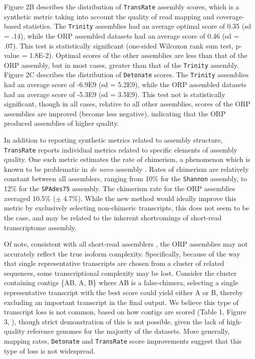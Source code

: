 \documentclass[10pt,letterpaper]{article}
\newcommand{\tit}{\textit}
\begin{document}
Figure 2B describes the distribution of \texttt{TransRate} assembly scores, which is a synthetic metric taking into account the quality of read mapping and coverage-based statistics. The \texttt{Trinity} assemblies had an average optimal score of 0.35 (sd = .14), while the ORP assembled datasets had an average score of 0.46 (sd = .07). This test is statistically significant (one-sided Wilcoxon rank sum test, p-value = 1.8E-2). Optimal scores of the other assemblies are less than that of the ORP assembly, but in most cases, greater than that of the \texttt{Trinity} assembly. Figure 2C describes the distribution of \texttt{Detonate} scores. The \texttt{Trinity} assemblies had an average score of -6.9E9 (sd = 5.2E9), while the ORP assembled datasets had an average score of -5.3E9 (sd = 3.5E9). This test not is statistically significant, though in all cases, relative to all other assemblies, scores of the ORP assemblies are improved (become less negative), indicating that the ORP produced assemblies of higher quality. 

In addition to reporting synthetic metrics related to assembly structure, \texttt{TransRate} reports individual metrics related to specific elements of assembly quality. One such metric estimates the rate of chimerism, a phenomenon which is known to be problematic in \tit{de novo} assembly \citep{Ungaro:2017kf, Singhal:2013dq}. Rates of chimerism are relatively constant between all assemblers, ranging from 10\% for the \texttt{Shannon} assembly, to 12\% for the \texttt{SPAdes75} assembly. The chimerism rate for the ORP assemblies averaged 10.5\% ($\pm$ 4.7\%). While the new method would ideally improve this metric by exclusively selecting non-chimeric transcripts, this does not seem to be the case, and may be related to the inherent shortcomings of short-read transcriptome assembly.

Of note, consistent with all short-read assemblers \citep{Ungaro:2017kf}, the ORP assemblies may not accurately reflect the true isoform complexity. Specifically, because of the way that single representative transcripts are chosen from a cluster of related sequences, some transcriptional complexity may be lost. Consider the cluster containing contigs \{AB, A, B\} where AB is a false-chimera, selecting a single representative transcript with the best score could yield either A or B, thereby excluding an important transcript in the final output. We believe this type of transcript loss is not common, based on how contigs are scored (Table 1, Figure 3, \cite{SmithUnna:2016go}), though strict demonstration of this is not possible, given the lack of high-quality reference genomes for the majority of the datasets. More generally, mapping rates, \texttt{Detonate} and \texttt{TransRate} score improvements suggest that this type of loss is not widespread.
\end{document}
